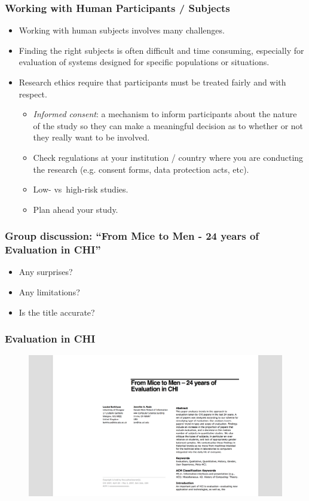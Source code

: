 \documentclass[screen, aspectratio=169]{beamer}
\begin{document}
\begin{frame}
\frametitle{Working with Human Participants / Subjects}
\begin{itemize}
\item Working with human subjects involves many challenges.
\item Finding the right subjects is often difficult and time consuming, especially for evaluation of systems designed for specific populations or situations.
\item Research ethics require that participants must be treated fairly and with respect.
\begin{itemize}
\item \emph{Informed consent}: a mechanism to inform participants about the nature of the study so they can make a meaningful decision as to whether or not they really want to be involved.
\item Check regulations at your institution / country where you are conducting the research (e.g. consent forms, data protection acts, etc).
\item Low- vs\ high-risk studies.
\item Plan ahead your study.
\end{itemize}
\end{itemize}
\end{frame}
%
\begin{frame}
\frametitle{Group discussion: ``From Mice to Men - 24 years of Evaluation in CHI''}
\begin{itemize}
\item Any surprises? 
\item Any limitations? 
\item Is the title accurate?
\end{itemize}
\end{frame}
%
%
\begin{frame}
\frametitle{Evaluation in CHI}
 \begin{figure}
	\includegraphics[scale=0.25]{img/Barkhuus-Rode-2007.png}\\
	\cite{Barkhuus.Rode.2007.evalchi}
    \end{figure}	
\end{frame}
\end{document}
